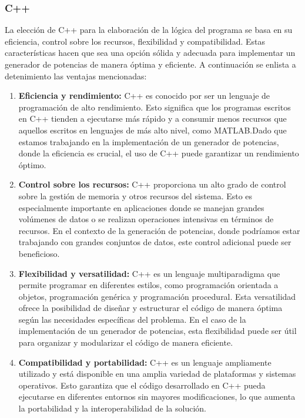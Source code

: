 \documentclass{article}
\begin{document}
        \subsubsection{C++}
            La elección de C++ para la elaboración de la lógica del programa se basa en su eficiencia, control sobre los recursos,
            flexibilidad y compatibilidad. Estas características hacen que sea una opción sólida y adecuada para implementar un generador
            de potencias de manera óptima y eficiente. A continuación se enlista a detenimiento las ventajas mencionadas:
            \begin{enumerate}
                \item \textbf{Eficiencia y rendimiento:} C++ es conocido por ser un lenguaje de programación de alto rendimiento.
                Esto significa que los programas escritos en C++ tienden a ejecutarse más rápido y a consumir menos recursos que aquellos
                escritos en lenguajes de más alto nivel, como MATLAB.\@ Dado que estamos trabajando en la implementación de un generador de
                potencias, donde la eficiencia es crucial, el uso de C++ puede garantizar un rendimiento óptimo.

                \item \textbf{Control sobre los recursos:} C++ proporciona un alto grado de control sobre la gestión de memoria y otros
                recursos del sistema. Esto es especialmente importante en aplicaciones donde se manejan grandes volúmenes de datos o se
                realizan operaciones intensivas en términos de recursos. En el contexto de la generación de potencias, donde podríamos
                estar trabajando con grandes conjuntos de datos, este control adicional puede ser beneficioso.

                \item \textbf{Flexibilidad y versatilidad:} C++ es un lenguaje multiparadigma que permite programar en diferentes estilos,
                como programación orientada a objetos, programación genérica y programación procedural. Esta versatilidad ofrece la
                posibilidad de diseñar y estructurar el código de manera óptima según las necesidades específicas del problema. En el caso
                de la implementación de un generador de potencias, esta flexibilidad puede ser útil para organizar y modularizar el código
                de manera eficiente.

                \item \textbf{Compatibilidad y portabilidad:} C++ es un lenguaje ampliamente utilizado y está disponible en una amplia
                variedad de plataformas y sistemas operativos. Esto garantiza que el código desarrollado en C++ pueda ejecutarse en
                diferentes entornos sin mayores modificaciones, lo que aumenta la portabilidad y la interoperabilidad de la solución.
            \end{enumerate}
\end{document}

